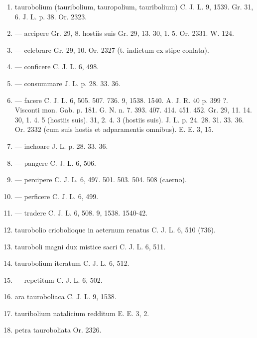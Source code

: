 \documentclass[a4paper, 11pt, oneside, polutonikogreek, german, twocolumn]{article}
\begin{document}
\begin{enumerate}
\item taurobolium (tauribolium, tauropolium, tauribolium) C. J. L. 9, 1539. Gr. 31, 6. J. L. p. 38. Or. 2323.

\item --- accipere Gr. 29, 8. hostiis suis Gr. 29, 13. 30, 1. 5. Or. 2331. W. 124.

\item --- celebrare Gr. 29, 10. Or. 2327 (t. indictum ex stipe conlata).

\item --- conficere C. J. L. 6, 498.

\item --- consummare J. L. p. 28. 33. 36.

\item --- facere C. J. L. 6, 505. 507. 736. 9, 1538. 1540. A. J. R. 40 p. 399 ?. Visconti mon. Gab. p. 181. G. N. n. 7. 393. 407. 414. 451. 452. Gr. 29, 11. 14. 30, 1. 4. 5 (hostiis suis). 31, 2. 4. 3 (hostiis suis). J. L. p. 24. 28. 31. 33. 36. Or. 2332 (cum suis hostis et adparamentis omnibus). E. E. 3, 15.

\item --- inchoare J. L. p. 28. 33. 36.

\item --- pangere C. J. L. 6, 506.

\item --- percipere C. J. L. 6, 497. 501. 503. 504. 508 (caerno).

\item --- perficere C. J. L. 6, 499.

\item --- tradere C. J. L. 6, 508. 9, 1538. 1540-42.

\item taurobolio criobolioque in aeternum renatus C. J. L. 6, 510 (736).

\item tauroboli magni dux mistice sacri C. J. L. 6, 511.

\item taurobolium iteratum C. J. L. 6, 512.

\item --- repetitum C. J. L. 6, 502.

\item ara tauroboliaca C. J. L. 9, 1538.

\item tauribolium natalicium redditum E. E. 3, 2.

\item petra tauroboliata Or. 2326.


\end{enumerate}
\end{document}

